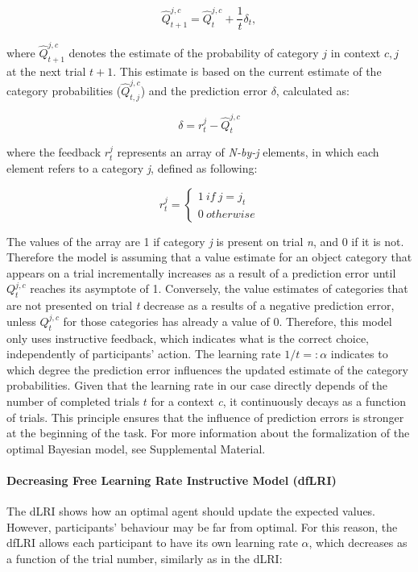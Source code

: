 \documentclass[a4paper,12pt]{article}
\begin{document}
\begin{equation}
\hat{Q}_{t+1}^{j,c} = \hat{Q}_{t}^{j,c}  + \dfrac{1}{t} \delta_{t},
\end{equation}


\noindent
where $\hat{Q}_{t+1}^{j,c}$ denotes the estimate of the probability of category $j$ in context ${c,j}$ at the next trial $t+1$. This estimate is based on the current estimate of the category probabilities ($\hat{Q}_{t,j}^{j, c}$) and the prediction error $\delta$, calculated as:

\begin{equation}
{\delta} = {r}_t^{j} - \hat{Q}_{t}^{j,c}
\label{eq:PE}
\end{equation}

\noindent
where the feedback ${r}_t^{j}$ represents an array of \textit{N-by-j} elements, in which each element refers to a category \textit{j}, defined as following:

\begin{equation}
r_t^j = \begin{cases}
1\ if  \ j = j_t  \\ 
0 \ otherwise
\end{cases}
\label{eq:instrPE}
\end{equation}

\noindent
The values of the array are 1 if category \textit{j} is present on trial \textit{n}, and 0 if it is not. Therefore the model is assuming that a value estimate for an object category that appears on a trial incrementally increases as a result of a prediction error until $Q_{t}^{j,c}$ reaches its asymptote of 1. Conversely, the value estimates of categories that are not presented on trial \textit{t} decrease as a results of a negative prediction error, unless $Q_{t}^{j,c}$ for those categories has already a value of 0. 
Therefore, this model only uses instructive feedback, which indicates what is the correct choice, independently of participants' action. The learning rate $1/t =: \alpha$ indicates to which degree the prediction error influences the updated estimate of the category probabilities. Given that the learning rate in our case directly depends of the number of completed trials $t$ for a context \textit{c}, it continuously decays as a function of trials. This principle ensures that the influence of prediction errors is stronger at the beginning of the task. For more information about the formalization of the optimal Bayesian model, see Supplemental Material. 

\paragraph{Decreasing Free Learning Rate Instructive Model (dfLRI)}
The dLRI shows how an optimal agent should update the expected values. However, participants' behaviour may be far from optimal.
For this reason, the dfLRI allows each participant to have its own learning rate $\alpha$, which decreases as a function of the trial number, similarly as in the dLRI: 
\end{document}
